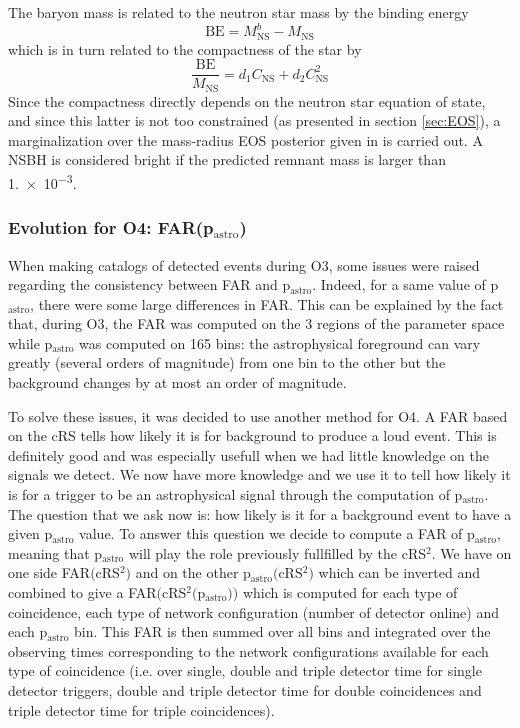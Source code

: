 The baryon mass is related to the neutron star mass by the binding energy
%
\begin{equation}
  \textrm{BE} = M^b_{\textrm{NS}} - M_{\textrm{NS}}
\end{equation}
%
which is in turn related to the compactness of the star \cite{binding_energy} by
%
\begin{equation}
  \frac{\textrm{BE}}{M_{\textrm{NS}}} = d_1 C_{\textrm{NS}} + d_2 C_{\textrm{NS}}^2
\end{equation}
%
Since the compactness directly depends on the neutron star equation of state, and since this latter is not too constrained (as presented in section \ref{sec:EOS}), a marginalization over the mass-radius EOS posterior given in \cite{Legred_2021} is carried out.
A NSBH is considered bright if the predicted remnant mass is larger than \SI{1.e-3}{\msun}.


\subsubsection{Evolution for O4: FAR(p$_{\textrm{astro}}$)}
\label{sec:far_coinc_O4}

When making catalogs of detected events during O3, some issues were raised regarding the consistency between FAR and p$_{\textrm{astro}}$.
Indeed, for a same value of p$_{\textrm{astro}}$, there were some large differences in FAR.
This can be explained by the fact that, during O3, the FAR was computed on the 3 regions of the parameter space while p$_{\textrm{astro}}$ was computed on 165 bins:
the astrophysical foreground can vary greatly (several orders of magnitude) from one bin to the other but the background changes by at most an order of magnitude.

To solve these issues, it was decided to use another method for O4.
A FAR based on the cRS tells how likely it is for background to produce a loud event.
This is definitely good and was especially usefull when we had little knowledge on the signals we detect.
We now have more knowledge and we use it to tell how likely it is for a trigger to be an astrophysical signal through the computation of p$_{\textrm{astro}}$.
The question that we ask now is: how likely is it for a background event to have a given p$_{\textrm{astro}}$ value.
To answer this question we decide to compute a FAR of p$_{\textrm{astro}}$, meaning that p$_{\textrm{astro}}$ will play the role previously fullfilled by the cRS$^2$.
We have on one side FAR$($cRS$^2)$ and on the other p$_{\textrm{astro}}($cRS$^2)$ which can be inverted and combined to give a FAR$($cRS$^2($p$_{\textrm{astro}}))$ which is computed for each type of coincidence, each type of network configuration (number of detector online) and each p$_{\textrm{astro}}$ bin.
This FAR is then summed over all bins and integrated over the observing times corresponding to the network configurations available for each type of coincidence (i.e. over single, double and triple detector time for single detector triggers, double and triple detector time for double coincidences and triple detector time for triple coincidences).


